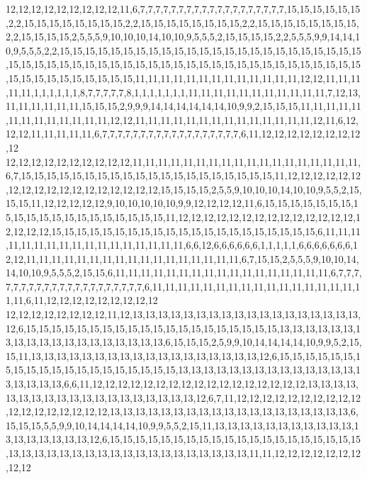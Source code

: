 12,12,12,12,12,12,12,12,12,11,6,7,7,7,7,7,7,7,7,7,7,7,7,7,7,7,7,7,7,7,15,15,15,15,15,15,2,2,15,15,15,15,15,15,15,15,2,2,15,15,15,15,15,15,15,15,2,2,15,15,15,15,15,15,15,15,2,2,15,15,15,15,2,5,5,5,9,10,10,10,14,10,10,9,5,5,5,2,15,15,15,15,2,2,5,5,5,9,9,14,14,10,9,5,5,5,2,2,15,15,15,15,15,15,15,15,15,15,15,15,15,15,15,15,15,15,15,15,15,15,15,15,15,15,15,15,15,15,15,15,15,15,15,15,15,15,15,15,15,15,15,15,15,15,15,15,15,15,15,15,15,15,15,15,15,15,15,15,15,15,11,11,11,11,11,11,11,11,11,11,11,11,11,12,12,11,11,11,11,11,1,1,1,1,1,1,8,7,7,7,7,7,8,1,1,1,1,1,1,1,11,11,11,11,11,11,11,11,11,11,11,7,12,13,11,11,11,11,11,11,15,15,15,2,9,9,9,14,14,14,14,14,14,10,9,9,2,15,15,15,11,11,11,11,11,11,11,11,11,11,11,11,11,12,12,11,11,11,11,11,11,11,11,11,11,11,11,11,11,12,11,6,12,12,12,11,11,11,11,11,6,7,7,7,7,7,7,7,7,7,7,7,7,7,7,7,7,7,7,6,11,12,12,12,12,12,12,12,12,12
12,12,12,12,12,12,12,12,12,12,11,11,11,11,11,11,11,11,11,11,11,11,11,11,11,11,11,11,6,7,15,15,15,15,15,15,15,15,15,15,15,15,15,15,15,15,15,15,15,15,11,12,12,12,12,12,12,12,12,12,12,12,12,12,12,12,12,12,12,15,15,15,15,2,5,5,9,10,10,10,14,10,10,9,5,5,2,15,15,15,11,12,12,12,12,12,9,10,10,10,10,10,9,9,12,12,12,12,11,6,15,15,15,15,15,15,15,15,15,15,15,15,15,15,15,15,15,15,15,15,11,12,12,12,12,12,12,12,12,12,12,12,12,12,12,12,12,12,12,15,15,15,15,15,15,15,15,15,15,15,15,15,15,15,15,15,15,15,15,15,6,11,11,11,11,11,11,11,11,11,11,11,11,11,11,11,11,11,6,6,12,6,6,6,6,6,6,1,1,1,1,1,6,6,6,6,6,6,6,12,12,11,11,11,11,11,11,11,11,11,11,11,11,11,11,11,11,11,6,7,15,15,2,5,5,5,9,10,10,14,14,10,10,9,5,5,5,2,15,15,6,11,11,11,11,11,11,11,11,11,11,11,11,11,11,11,11,11,6,7,7,7,7,7,7,7,7,7,7,7,7,7,7,7,7,7,7,7,7,7,6,11,11,11,11,11,11,11,11,11,11,11,11,11,11,11,11,11,11,6,11,12,12,12,12,12,12,12,12,12
12,12,12,12,12,12,12,12,11,12,13,13,13,13,13,13,13,13,13,13,13,13,13,13,13,13,13,13,12,6,15,15,15,15,15,15,15,15,15,15,15,15,15,15,15,15,15,15,15,15,13,13,13,13,13,13,13,13,13,13,13,13,13,13,13,13,13,13,13,6,15,15,15,2,5,9,9,10,14,14,14,14,10,9,9,5,2,15,15,11,13,13,13,13,13,13,13,13,13,13,13,13,13,13,13,13,13,13,12,6,15,15,15,15,15,15,15,15,15,15,15,15,15,15,15,15,15,15,15,15,13,13,13,13,13,13,13,13,13,13,13,13,13,13,13,13,13,13,13,6,6,11,12,12,12,12,12,12,12,12,12,12,12,12,12,12,12,12,12,13,13,13,13,13,13,13,13,13,13,13,13,13,13,13,13,13,13,13,12,6,7,11,12,12,12,12,12,12,12,12,12,12,12,12,12,12,12,12,12,12,13,13,13,13,13,13,13,13,13,13,13,13,13,13,13,13,13,13,13,6,15,15,15,5,5,9,9,10,14,14,14,14,10,9,9,5,5,2,15,11,13,13,13,13,13,13,13,13,13,13,13,13,13,13,13,13,13,13,12,6,15,15,15,15,15,15,15,15,15,15,15,15,15,15,15,15,15,15,15,15,13,13,13,13,13,13,13,13,13,13,13,13,13,13,13,13,13,13,13,11,11,12,12,12,12,12,12,12,12,12
